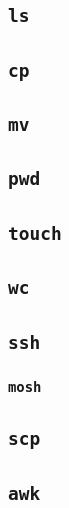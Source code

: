 \documentclass[
]{book}
\begin{document}
\hypertarget{ls}{%
\subsection{\texorpdfstring{\texttt{ls}}{ls}}\label{ls}}

\hypertarget{cp}{%
\subsection{\texorpdfstring{\texttt{cp}}{cp}}\label{cp}}

\hypertarget{mv}{%
\subsection{\texorpdfstring{\texttt{mv}}{mv}}\label{mv}}

\hypertarget{pwd}{%
\subsection{\texorpdfstring{\texttt{pwd}}{pwd}}\label{pwd}}

\hypertarget{touch}{%
\subsection{\texorpdfstring{\texttt{touch}}{touch}}\label{touch}}

\hypertarget{wc}{%
\subsection{\texorpdfstring{\texttt{wc}}{wc}}\label{wc}}

\hypertarget{ssh}{%
\subsection{\texorpdfstring{\texttt{ssh}}{ssh}}\label{ssh}}

\hypertarget{mosh}{%
\subsubsection{\texorpdfstring{\texttt{mosh}}{mosh}}\label{mosh}}

\hypertarget{scp}{%
\subsection{\texorpdfstring{\texttt{scp}}{scp}}\label{scp}}

\hypertarget{awk}{%
\subsection{\texorpdfstring{\texttt{awk}}{awk}}\label{awk}}
\end{document}
